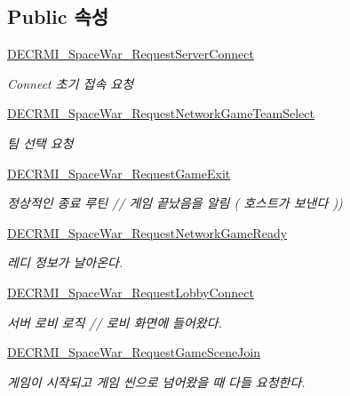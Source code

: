 \subsection*{Public 속성}
\begin{DoxyCompactItemize}
\item 
\hyperlink{class_server_a1e3feb269047d6abddb2b4f2cdb39361}{D\+E\+C\+R\+M\+I\+\_\+\+Space\+War\+\_\+\+Request\+Server\+Connect}
\begin{DoxyCompactList}\small\item\em Connect 초기 접속 요청 \end{DoxyCompactList}\item 
\hyperlink{class_server_a53a1274639fcb9927ba998969888db24}{D\+E\+C\+R\+M\+I\+\_\+\+Space\+War\+\_\+\+Request\+Network\+Game\+Team\+Select}
\begin{DoxyCompactList}\small\item\em 팀 선택 요청 \end{DoxyCompactList}\item 
\hyperlink{class_server_a5dfeab0635abd704466b740526c6e91d}{D\+E\+C\+R\+M\+I\+\_\+\+Space\+War\+\_\+\+Request\+Game\+Exit}
\begin{DoxyCompactList}\small\item\em 정상적인 종료 루틴 // 게임 끝났음을 알림 ( 호스트가 보낸다 )) \end{DoxyCompactList}\item 
\hyperlink{class_server_a883090b493ac52f208e1eba65aa3743b}{D\+E\+C\+R\+M\+I\+\_\+\+Space\+War\+\_\+\+Request\+Network\+Game\+Ready}
\begin{DoxyCompactList}\small\item\em 레디 정보가 날아온다. \end{DoxyCompactList}\item 
\hyperlink{class_server_ac30d0c86b248c0d9589dc0c7d492893f}{D\+E\+C\+R\+M\+I\+\_\+\+Space\+War\+\_\+\+Request\+Lobby\+Connect}
\begin{DoxyCompactList}\small\item\em 서버 로비 로직 // 로비 화면에 들어왔다. \end{DoxyCompactList}\item 
\hyperlink{class_server_a22fe25d46287ae41722c82dd28dab9d3}{D\+E\+C\+R\+M\+I\+\_\+\+Space\+War\+\_\+\+Request\+Game\+Scene\+Join}
\begin{DoxyCompactList}\small\item\em 게임이 시작되고 게임 씬으로 넘어왔을 때 다들 요청한다. \end{DoxyCompactList}\item 

\end{DoxyCompactItemize}
